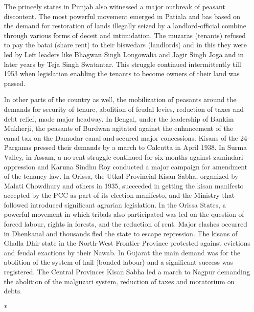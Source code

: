 The princely states in Punjab also witnessed a major outbreak of peasant discontent. The most powerful movement emerged in Patiala and bas based on the demand for restoration of lands illegally seized by a landlord-official combine through various forms of deceit and intimidation. The muzaras (tenants) refused to pay the batai (share rent) to their biswedars (landlords) and in this they were led by Left leaders like Bhagwan Singh Longowalia and Jagir Singh Joga and in later years by Teja Singh Swatantar. This struggle continued intermittently till 1953 when legislation enabling the tenants to become owners of their land was passed.

In other parts of the country as well, the mobilization of peasants around the demands for security of tenure, abolition of feudal levies, reduction of taxes and debt relief, made major headway. In Bengal, under the leadership of Bankim Mukherji, the peasants of Burdwan agitated against the enhancement of the canal tax on the Damodar canal and secured major concessions. Kisans of the 24-Parganas pressed their demands by a march to Calcutta in April 1938. In Surma Valley, in Assam, a no-rent struggle continued for six months against zamindari oppression and Karuna Sindhu Roy conducted a major campaign for amendment of the tenancy law. In Orissa, the Utkal Provincial Kisan Sabha, organized by Malati Chowdhury and others in 1935, succeeded in getting the kisan manifesto accepted by the PCC as part of its election manifesto, and the Ministry that followed introduced significant agrarian legislation. In the Orissa States, a powerful movement in which tribals also participated was led on the question of forced labour, rights in forests, and the reduction of rent. Major clashes occurred in Dhenkanal and thousands fled the state to escape repression. The kisans of Ghalla Dhir state in the North-West Frontier Province protested against evictions and feudal exactions by their Nawab. In Gujarat the main demand was for the abolition of the system of hail (bonded labour) and a significant success was registered. The Central Provinces Kisan Sabha led a march to Nagpur demanding the abolition of the malguzari system, reduction of taxes and moratorium on debts.

\begin{center}*\end{center}

\paragraph*{}


